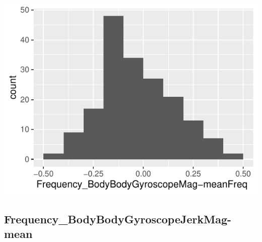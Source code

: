 \documentclass[
]{article}
\begin{document}
\begin{minipage}{0.25 \textwidth}

\includegraphics{codebook_tidydatasub_files/figure-latex/Var-78-Frequency-BodyBodyGyroscopeMag-meanFreq--1.pdf}

\end{minipage}

\noindent\makebox[\linewidth]{\rule{\textwidth}{0.4pt}}

\hypertarget{frequency_bodybodygyroscopejerkmag-mean}{%
\subsection{Frequency\_BodyBodyGyroscopeJerkMag-mean}\label{frequency_bodybodygyroscopejerkmag-mean}}
\end{document}
